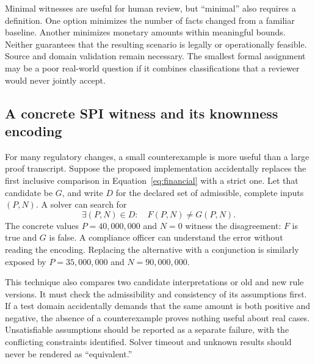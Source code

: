 Minimal witnesses are useful for human review, but ``minimal'' also requires a
definition. One option minimizes the number of facts changed from a familiar
baseline. Another minimizes monetary amounts within meaningful bounds. Neither
guarantees that the resulting scenario is legally or operationally feasible.
Source and domain validation remain necessary. The smallest formal assignment
may be a poor real-world question if it combines classifications that a reviewer
would never jointly accept.

\subsection{A concrete SPI witness and its knownness encoding}
\label{merge:P-03-product:06}


For many regulatory changes, a small counterexample is more useful than a large
proof transcript. Suppose the proposed implementation accidentally replaces the
first inclusive comparison in Equation~\eqref{eq:financial} with a strict one.
Let that candidate be $G$, and write $D$ for the declared set of admissible,
complete inputs $(P,N)$. A solver can search for
\begin{equation}
 \exists (P,N)\in D:\quad F(P,N)\ne G(P,N).
 \label{eq:counterexample}
\end{equation}
The concrete values $P=40{,}000{,}000$ and $N=0$ witness the disagreement:
$F$ is true and $G$ is false. A compliance officer can understand the error
without reading the encoding. Replacing the alternative with a conjunction is
similarly exposed by $P=35{,}000{,}000$ and $N=90{,}000{,}000$.

This technique also compares two candidate interpretations or old and new rule
versions. It must check the admissibility and consistency of its assumptions
first. If a test domain accidentally demands that the same amount is both
positive and negative, the absence of a counterexample proves nothing useful
about real cases. Unsatisfiable assumptions should be reported as a separate
failure, with the conflicting constraints identified. Solver timeout and unknown
results should never be rendered as ``equivalent.''

